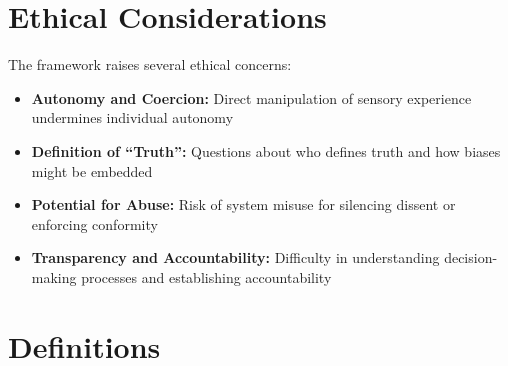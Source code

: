 \documentclass[12pt, a4paper]{article}
\begin{document}
\section{Ethical Considerations}

The framework raises several ethical concerns:

\begin{itemize}
    \item \textbf{Autonomy and Coercion:} Direct manipulation of sensory experience undermines individual autonomy
    \item \textbf{Definition of ``Truth'':} Questions about who defines truth and how biases might be embedded
    \item \textbf{Potential for Abuse:} Risk of system misuse for silencing dissent or enforcing conformity
    \item \textbf{Transparency and Accountability:} Difficulty in understanding decision-making processes and establishing accountability
\end{itemize}

\section{Definitions}
\end{document}
